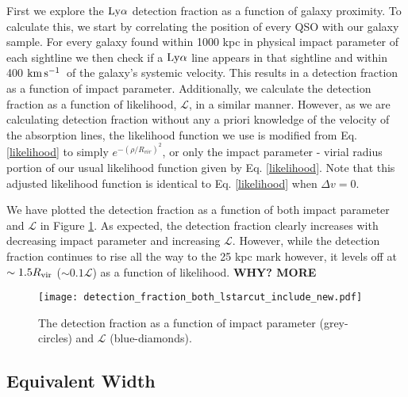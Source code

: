 \documentclass[twocolumn,tighten]{aastex62}
\newcommand{\kms}{$\rm km\, s^{-1}$}
\begin{document}
First we explore the $\rm Ly\alpha$ detection fraction as a function of galaxy proximity. To calculate this, we start by correlating the position of every QSO with our galaxy sample. For every galaxy found within 1000 kpc in physical impact parameter of each sightline we then check if a $\rm Ly\alpha$ line appears in that sightline and within 400 \kms~of the galaxy's systemic velocity. This results in a detection fraction as a function of impact parameter. Additionally, we calculate the detection fraction as a function of likelihood, $\mathcal{L}$, in a similar manner. However, as we are calculating detection fraction without any a priori knowledge of the velocity of the absorption lines, the likelihood function we use is modified from Eq. \ref{likelihood} to simply $e^{-(\rho/R_{vir})^2}$, or only the impact parameter - virial radius portion of our usual likelihood function given by Eq. \ref{likelihood}. Note that this adjusted likelihood function is identical to Eq. \ref{likelihood} when $\Delta v = 0$. 

We have plotted the detection fraction as a function of both impact parameter and $\mathcal{L}$ in Figure \ref{detection_fraction}. As expected, the detection fraction clearly increases with decreasing impact parameter and increasing $\mathcal{L}$. However, while the detection fraction continues to rise all the way to the 25 kpc mark however, it levels off at $\sim 1.5 R_{\rm vir}$ ($\sim 0.1 \mathcal{L}$) as a function of likelihood. \textbf{WHY? MORE}

\begin{figure}[ht!]
        \centering
        \vspace{0pt}
        \texttt{[image: detection\_fraction\_both\_lstarcut\_include\_new.pdf]}
        \caption{\small{The detection fraction as a function of impact parameter (grey-circles) and $\mathcal{L}$ (blue-diamonds).}}
        \vspace{5pt}
        \label{detection_fraction}
\end{figure}



\subsection{Equivalent Width}
\end{document}
